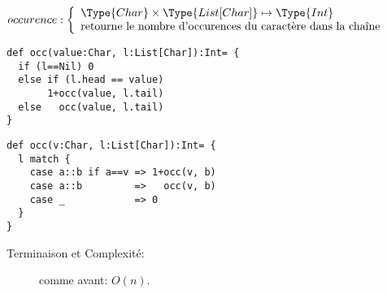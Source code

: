 \documentclass[10pt]{article}\usepackage[correction,nu]{esial}
\begin{document}
\begin{Question}
  $occurence: \left\{
    \begin{array}{l}
      \Type{Char}\times \Type{List[Char]}\mapsto \Type{Int}\\
      \text{retourne le nombre d'occurences du caractère dans la chaîne}
    \end{array}\right.$  
\end{Question}
\begin{Reponse}
  \begin{minipage}{.49\linewidth}
  \begin{Verbatim}
def occ(value:Char, l:List[Char]):Int= {
  if (l==Nil) 0
  else if (l.head == value) 
       1+occ(value, l.tail)
  else   occ(value, l.tail)
}

  \end{Verbatim}    
  \end{minipage}
  \begin{minipage}{.49\linewidth}
  \begin{Verbatim}[numbers=right]
def occ(v:Char, l:List[Char]):Int= {
  l match {
    case a::b if a==v => 1+occ(v, b)
    case a::b         =>   occ(v, b)
    case _            => 0
  }
}
  \end{Verbatim}        
  \end{minipage}
  \begin{description}
  \item[Terminaison et Complexité:] comme avant: $O(n)$. 
  \end{description}
\end{Reponse}
\end{document}
